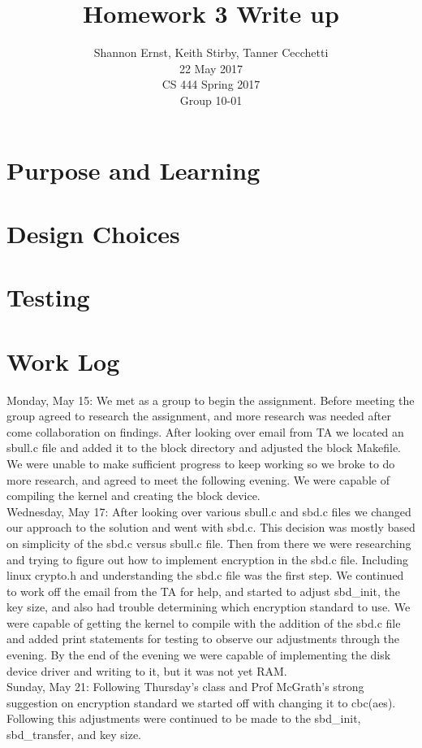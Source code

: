 \documentclass[letterpaper,10pt,serif,draftclsnofoot,onecolumn,compsoc,titlepage]{IEEEtran}
\title{Homework 3 Write up}
\author{Shannon Ernst, Keith Stirby, Tanner Cecchetti\\ 22 May 2017 \\ CS 444 Spring 2017 \\ Group 10-01}
\begin{document}
\maketitle
\begin{abstract}

\end{abstract}
\newpage
\tableofcontents
\newpage
\section{Purpose and Learning}

\section{Design Choices}

\section{Testing}

\section{Work Log}
Monday, May 15: We met as a group to begin the assignment. Before meeting the group agreed to research the assignment, and more research was needed after come collaboration on findings. After looking over email from TA we located an sbull.c file and added it to the block directory and adjusted the block Makefile. We were unable to make sufficient progress to keep working so we broke to do more research, and agreed to meet the following evening. We were capable of compiling the kernel and creating the block device. \\
Wednesday, May 17: After looking over various sbull.c and sbd.c files we changed our approach to the solution and went with sbd.c. This decision was mostly based on simplicity of the sbd.c versus sbull.c file. Then from there we were researching and trying to figure out how to implement encryption in the sbd.c file. Including linux crypto.h and understanding the sbd.c file was the first step. We continued to work off the email from the TA for help, and started to adjust sbd\_init, the key size, and also had trouble determining which encryption standard to use. We were capable of getting the kernel to compile with the addition of the sbd.c file and added print statements for testing to observe our adjustments through the evening. By the end of the evening we were capable of implementing the disk device driver and writing to it, but it was not yet RAM. \\
Sunday, May 21: Following Thursday's class and Prof McGrath's strong suggestion on encryption standard we started off with changing it to cbc(aes). Following this adjustments were continued to be made to the sbd\_init, sbd\_transfer, and key size. \\
\end{document}
